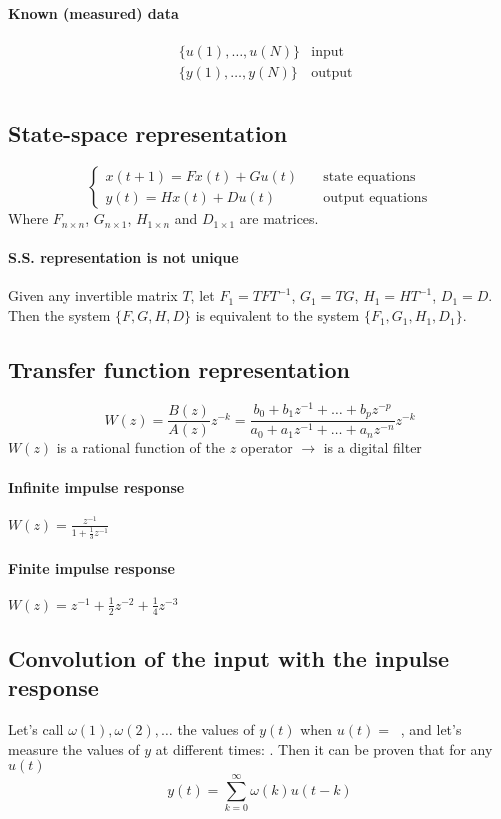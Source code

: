\documentclass{report}
\DeclareMathOperator{\imp}{impulse(0)}
\begin{document}
\paragraph{Known (measured) data}
\begin{align*}
&\{u(1),\dots,u(N)\}&\text{input}\\
&\{y(1),\dots,y(N)\}&\text{output}\\
\end{align*}
\subsection{State-space representation}
\[
\begin{cases}
x(t+1)=Fx(t)+Gu(t)&\quad\text{state equations}\\
y(t)=Hx(t)+Du(t)&\quad\text{output equations}
\end{cases}
\]
Where $F_{n\times n}$, $G_{n\times 1}$, $H_{1\times n}$ and $D_{1\times 1}$ are matrices.
\paragraph{S.S. representation is not unique} Given any invertible matrix $T$, let $F_1=TFT^{-1}$, $G_1=TG$, $H_1=HT^{-1}$, $D_1=D$. Then the system $\{F,G,H,D\}$ is equivalent to the system $\{F_1,G_1,H_1,D_1\}$.
\subsection{Transfer function representation}
\[
W(z)
=
\frac{B(z)}{A(z)}z^{-k}
=
\frac{
	b_0+b_1z^{-1}+\dots+b_pz^{-p}
}{
	a_0+a_1z^{-1}+\dots+a_nz^{-n}
}z^{-k}
\]
$W(z)$ is a rational function of the $z$ operator $\rightarrow$ is a digital filter
\paragraph{Infinite impulse response} 
$W(z)=
\frac{
	z^{-1}
}{
	1+\frac{1}{3}z^{-1}
}$
\paragraph{Finite impulse response}
$
W(z)=z^{-1}+\frac{1}{2}z^{-2}+\frac{1}{4}z^{-3}
$

\subsection{Convolution of the input with the inpulse response}
Let's call $\omega(1), \omega(2), \dots$ the values of $y(t)$ when $u(t)=\imp$, and let's measure the values of $y$ at different times: . Then it can be proven that for any $u(t)$
\[
y(t)=\sum_{k=0}^\infty \omega(k)u(t-k)
\]
\end{document}
